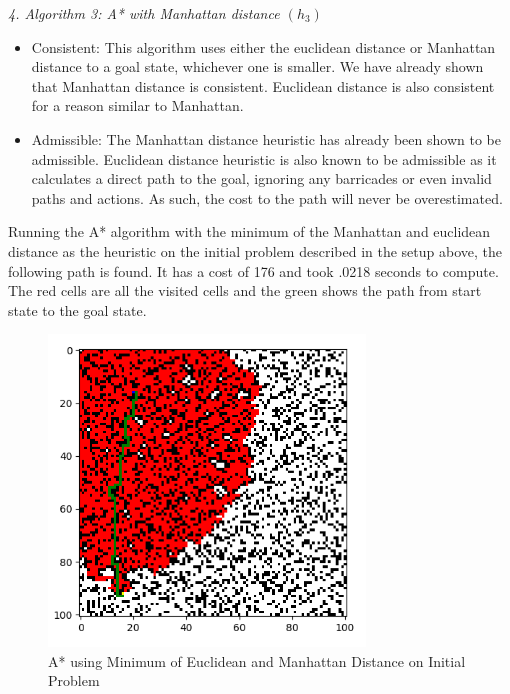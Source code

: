 \documentclass[a4paper]{article}
\begin{document}
\textit{4. Algorithm 3: A* with Manhattan distance $(h_3)$}
\begin{itemize}
    \item Consistent: This algorithm uses either the euclidean distance or Manhattan distance to a goal state, whichever one is smaller. We have already shown that Manhattan distance is consistent. Euclidean distance is also consistent for a reason similar to Manhattan.
    \item Admissible: The Manhattan distance heuristic has already been shown to be admissible. Euclidean distance heuristic is also known to be admissible as it calculates a direct path to the goal, ignoring any barricades or even invalid paths and actions. As such, the cost to the path will never be overestimated.
\end{itemize}
Running the A* algorithm with the minimum of the Manhattan and euclidean distance as the heuristic on the initial problem described in the setup above, the following path is found. It has a cost of 176 and took .0218 seconds to compute. The red cells are all the visited cells and the green shows the path from start state to the goal state.

\begin{figure}[ht]
    \centering
    \includegraphics[width=0.75\textwidth]{fig5.png}
    \caption{A* using Minimum of Euclidean and Manhattan Distance on Initial Problem}
    \label{fig:h3}
\end{figure}
\end{document}
